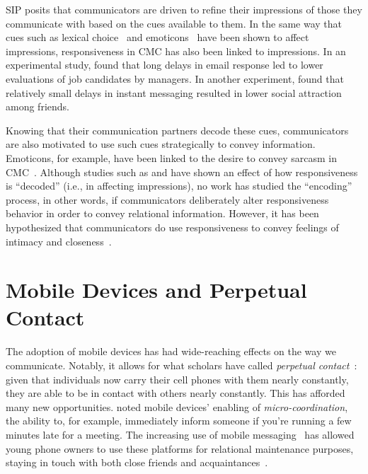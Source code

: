 \documentclass[12pt]{nuthesis}	%
\begin{document}
SIP posits that communicators are driven to refine their impressions of those they communicate with based on the cues available to them. In the same way that cues such as lexical choice~\citep{muir2017linguistic,nguyen2016effects} and emoticons~\citep{tossell2012longitudinal, walther2001impacts} have been shown to affect impressions, responsiveness in CMC has also been linked to impressions. In an experimental study, \citet{kalman2011online} found that long delays in email response led to lower evaluations of job candidates by managers. In another experiment, \citet{heston2017worth} found that relatively small delays in instant messaging resulted in lower social attraction among friends.

Knowing that their communication partners decode these cues, communicators are also motivated to use such cues strategically to convey information. Emoticons, for example, have been linked to the desire to convey sarcasm in CMC~\citep{wolf2000emotional}. Although studies such as \citet{kalman2011online} and \citet{heston2017worth} have shown an effect of how responsiveness is ``decoded'' (i.e., in affecting impressions), no work has studied the ``encoding'' process, in other words, if communicators deliberately alter responsiveness behavior in order to convey relational information. However, it has been hypothesized that communicators do use responsiveness to convey feelings of intimacy and closeness~\citep{kalman2006pauses,walther1995nonverbal}.

\section{Mobile Devices and Perpetual Contact}

The adoption of mobile devices has had wide-reaching effects on the way we communicate. Notably, it allows for what scholars have called \textit{perpetual contact}~\citep{katz2002perpetual}: given that individuals now carry their cell phones with them nearly constantly, they are able to be in contact with others nearly constantly. This has afforded many new opportunities. \citet{ling200210} noted mobile devices' enabling of \textit{micro-coordination}, the ability to, for example, immediately inform someone if you're running a few minutes late for a meeting. The increasing use of mobile messaging~\citep{duggan2015mobile,smith2015us} has allowed young phone owners to use these platforms for relational maintenance purposes, staying in touch with both close friends and acquaintances~\citep{pettegrew2015smart}.
\end{document}

